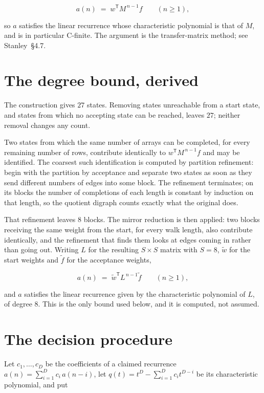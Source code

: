 \documentclass[11pt]{article}
\theoremstyle{definition}
\begin{document}
\[a(n) \;=\; w^{\mathsf T} M^{\,n-1} f \qquad (n \ge 1),\]

so $a$ satisfies the linear recurrence whose characteristic polynomial is that of $M$, and is in particular C-finite. The argument is the transfer-matrix method; see Stanley~\S4.7.

\section{The degree bound, derived}

The construction gives $27$ states. Removing states unreachable from a start state, and states from which no accepting state can be reached, leaves $27$; neither removal changes any count.

Two states from which the same number of arrays can be completed, for every remaining number of rows, contribute identically to $w^{\mathsf T}M^{\,n-1}f$ and may be identified. The coarsest such identification is computed by partition refinement: begin with the partition by acceptance and separate two states as soon as they send different numbers of edges into some block. The refinement terminates; on its blocks the number of completions of each length is constant by induction on that length, so the quotient digraph counts exactly what the original does.

That refinement leaves $8$ blocks. The mirror reduction is then applied: two blocks receiving the same weight from the start, for every walk length, also contribute identically, and the refinement that finds them looks at edges coming in rather than going out. Writing $L$ for the resulting $S \times S$ matrix with $S = 8$, $\tilde w$ for the start weights and $\tilde f$ for the acceptance weights,

\[a(n) \;=\; \tilde w^{\mathsf T} L^{\,n-1} \tilde f \qquad (n \ge 1),\]

and $a$ satisfies the linear recurrence given by the characteristic polynomial of $L$, of degree $8$. This is the only bound used below, and it is computed, not assumed.

\section{The decision procedure}

Let $c_1,\dots,c_D$ be the coefficients of a claimed recurrence $a(n) = \sum_{i=1}^{D} c_i\,a(n-i)$, let $q(t) = t^{D} - \sum_{i=1}^{D} c_i t^{D-i}$ be its characteristic polynomial, and put
\end{document}
